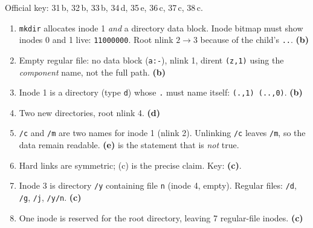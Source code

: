 \documentclass[11pt,a4paper]{article}
\newenvironment{Sol}{%
  \begin{tcolorbox}[sboxstyle, title={Solution}]%
}{%
  \end{tcolorbox}\vspace{0.35em}%
}
\begin{document}
\begin{Sol}
Official key: 31\,b, 32\,b, 33\,b, 34\,d, 35\,e, 36\,c, 37\,c, 38\,c.
\begin{enumerate}[(31)]
\item \texttt{mkdir} allocates inode 1 \emph{and} a directory data block.
      Inode bitmap must show inodes 0 and 1 live: \texttt{11000000}.
      Root nlink $2\to 3$ because of the child's \texttt{..}.
      \textbf{(b)}
\item Empty regular file: no data block (\texttt{a:-}), nlink 1, dirent
      \texttt{(z,1)} using the \emph{component} name, not the full path.
      \textbf{(b)}
\item Inode 1 is a directory (type \texttt{d}) whose \texttt{.} must name
      itself: \texttt{(.,1) (..,0)}. \textbf{(b)}
\item Two new directories, root nlink 4. \textbf{(d)}
\item \texttt{/c} and \texttt{/m} are two names for inode 1 (nlink 2).
      Unlinking \texttt{/c} leaves \texttt{/m}, so the data remain
      readable. \textbf{(e)} is the statement that is \emph{not} true.
\item Hard links are symmetric; (c) is the precise claim. Key: \textbf{(c)}.
\item Inode 3 is directory \texttt{/y} containing file \texttt{n}
      (inode 4, empty). Regular files: \texttt{/d}, \texttt{/g},
      \texttt{/j}, \texttt{/y/n}. \textbf{(c)}
\item One inode is reserved for the root directory, leaving 7 regular-file
      inodes. \textbf{(c)}
\end{enumerate}
\end{Sol}
\end{document}
